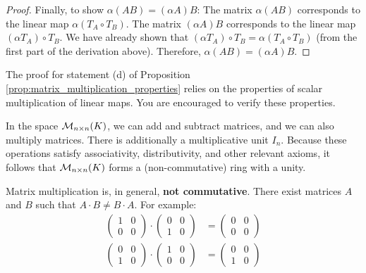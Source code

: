 \begin{proof}
Finally, to show $\alpha(AB) = (\alpha A)B$:
The matrix $\alpha(AB)$ corresponds to the linear map $\alpha(T_A \circ T_B)$.
The matrix $(\alpha A)B$ corresponds to the linear map $(\alpha T_A) \circ T_B$.
We have already shown that $(\alpha T_A) \circ T_B = \alpha (T_A \circ T_B)$ (from the first part of the derivation above).
Therefore, $\alpha(AB) = (\alpha A)B$.
\end{proof}

\begin{exercise}
The proof for statement (d) of Proposition \ref{prop:matrix_multiplication_properties} relies on the properties of scalar multiplication of linear maps. You are encouraged to verify these properties.
\end{exercise}

\begin{remark}
In the space $\mathcal{M}_{n \times n}(K)$, we can add and subtract matrices, and we can also multiply matrices. There is additionally a multiplicative unit $I_n$. Because these operations satisfy associativity, distributivity, and other relevant axioms, it follows that $\mathcal{M}_{n \times n}(K)$ forms a (non-com\-mu\-ta\-tive) ring with a unity.
\end{remark}

\begin{importantremark}
Matrix multiplication is, in general, \textbf{not commutative}. There exist matrices $A$ and $B$ such that $A \cdot B \neq B \cdot A$. For example:
\begin{align*}
    \begin{pmatrix} 1 & 0 \\ 0 & 0 \end{pmatrix} \cdot \begin{pmatrix} 0 & 0 \\ 1 & 0 \end{pmatrix} &= \begin{pmatrix} 0 & 0 \\ 0 & 0 \end{pmatrix} \\
    \begin{pmatrix} 0 & 0 \\ 1 & 0 \end{pmatrix} \cdot \begin{pmatrix} 1 & 0 \\ 0 & 0 \end{pmatrix} &= \begin{pmatrix} 0 & 0 \\ 1 & 0 \end{pmatrix}
\end{align*}
\end{importantremark}

